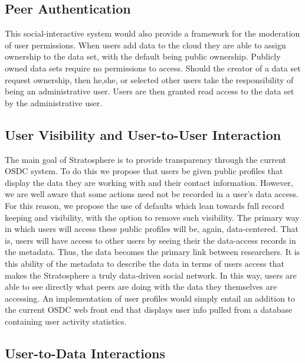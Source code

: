 \begin{multicols*}{2}

\subsection{Peer Authentication}

This social-interactive system would also provide a framework for the
moderation of user permissions.  When users add data to the cloud they
are able to assign ownership to the data set, with the default being
public ownership. Publicly owned data sets require no permissions to
access.  Should the creator of a data set request ownership, then
he,she, or selected other users take the responsibility of being an
administrative user. Users are then granted read access to the data
set by the administrative user.

\subsection{User Visibility and User-to-User Interaction}

The main goal of Stratosphere is to provide transparency through the
current OSDC system. To do this we propose that users be given public
profiles that display the data they are working with and their contact
information.  However, we are well aware that some actions need not be
recorded in a user's data access. For this reason, we propose the use
of defaults which lean towards full record keeping and visibility,
with the option to remove such visibility. The primary way in which
users will access these public profiles will be, again,
data-centered. That is, users will have access to other users by
seeing their the data-access records in the metadata. Thus, the data
becomes the primary link between researchers. It is this ability of
the metadata to describe the data in terms of users access that makes
the Stratosphere a truly data-driven social network. In this way,
users are able to see directly what peers are doing with the data they
themselves are accessing. An implementation of user profiles would
simply entail an addition to the current OSDC web front end that
displays user info pulled from a database containing user activity
statistics.

\subsection{User-to-Data Interactions}


\end{multicols*}
